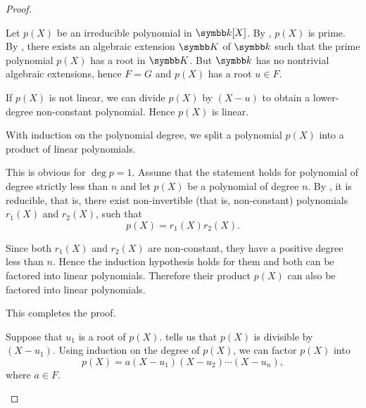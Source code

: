 \begin{proof}\mbox{}
  \begin{description}
     Let \( p(X) \) be an irreducible polynomial in \( \Bk[X] \). By , \( p(X) \) is prime. By , there exists an algebraic extension \( \BK \) of \( \Bk \) such that the prime polynomial \( p(X) \) has a root in \( \BK \). But \( \Bk \) has no nontrivial algebraic extensions, hence \( F = G \) and \( p(X) \) has a root \( u \in F \).

    If \( p(X) \) is not linear\LEM, we can divide \( p(X) \) by \( (X - u) \) to obtain a lower-degree non-constant polynomial. Hence \( p(X) \) is linear.

     With induction on the polynomial degree, we split a polynomial \( p(X) \) into a product of linear polynomials.

    This is obvious for \( \deg p = 1 \). Assume that the statement holds for polynomial of degree strictly less than \( n \) and let \( p(X) \) be a polynomial of degree \( n \). By , it is reducible, that is, there exist non-invertible (that is, non-constant) polynomials \( r_1(X) \) and \( r_2(X) \), such that
    \begin{equation*}
      p(X) = r_1(X) r_2(X).
    \end{equation*}

    Since both \( r_1(X) \) and \( r_2(X) \) are non-constant, they have a positive degree less than \( n \). Hence the induction hypothesis holds for them and both can be factored into linear polynomials. Therefore their product \( p(X) \) can also be factored into linear polynomials.

    This completes the proof.

     Suppose that \( u_1 \) is a root of \( p(X) \).  tells us that \( p(X) \) is divisible by \( (X - u_1) \). Using induction on the degree of \( p(X) \), we can factor \( p(X) \) into
    \begin{equation*}
      p(X) = a (X - u_1) (X - u_2) \cdots (X - u_n),
    \end{equation*}
    where \( a \in F \).


\end{description}
\end{proof}
